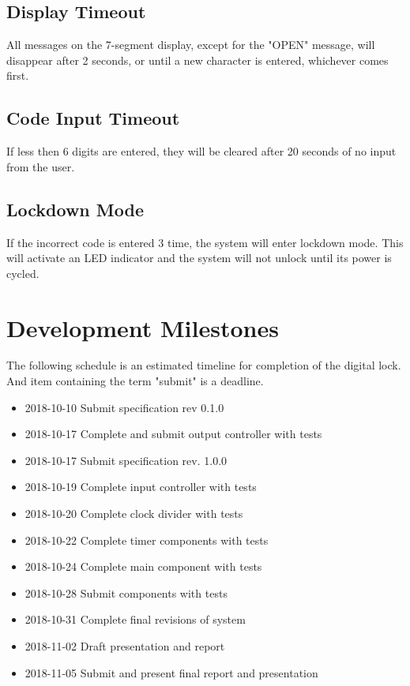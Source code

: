 \documentclass[11pt]{article}
\begin{document}
\subsection{Display Timeout}

All messages on the 7-segment display, except for the "OPEN" message, will disappear after 2 seconds, or until a new character is entered, whichever comes first.

\subsection{Code Input Timeout}

If less then 6 digits are entered, they will be cleared after 20 seconds of no input from the user.

\subsection{Lockdown Mode}

If the incorrect code is entered 3 time, the system will enter lockdown mode. This will activate an LED indicator and the system will not unlock until its power is cycled.

\section{Development Milestones}

The following schedule is an estimated timeline for completion of the digital lock. And item containing the term "submit" is a deadline.

\begin{itemize}
	\item 2018-10-10 Submit specification rev 0.1.0
	\item 2018-10-17 Complete and submit output controller with tests
	\item 2018-10-17 Submit specification rev. 1.0.0
	\item 2018-10-19 Complete input controller with tests
	\item 2018-10-20 Complete clock divider with tests
	\item 2018-10-22 Complete timer components with tests
	\item 2018-10-24 Complete main component with tests
	\item 2018-10-28 Submit components with tests
	\item 2018-10-31 Complete final revisions of system
	\item 2018-11-02 Draft presentation and report
	\item 2018-11-05 Submit and present final report and presentation
\end{itemize}
\end{document}
